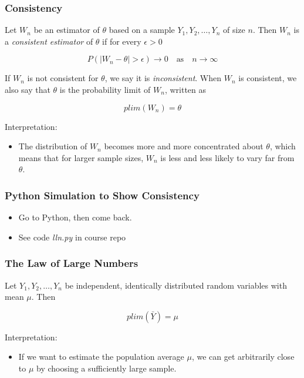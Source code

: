 \documentclass[12pt]{beamer}
\begin{document}
\begin{frame}
\frametitle{Consistency}
Let $W_{n}$ be an estimator of $\theta$ based on a sample $Y_{1}, Y_{2}, \ldots, Y_{n}$ of size $n$. Then
$W_{n}$ is a \emph{consistent estimator} of $\theta$ if for every $\epsilon > 0$

\vspace{2mm}
\begin{equation*}
P(|W_{n} - \theta| > \epsilon) \rightarrow 0 \quad \mbox{as} \quad n \rightarrow \infty
\end{equation*}

\vspace{3.5mm}
If $W_{n}$ is not consistent for $\theta$, we say it is \emph{inconsistent}. When $W_{n}$ is consistent,
we also say that $\theta$ is the probability limit of $W_{n}$, written as 

\begin{equation*}
plim(W_{n}) = \theta
\end{equation*}

\vspace{3.5mm}
Interpretation:

\begin{itemize}
 \item[] The distribution of $W_{n}$ becomes more and more concentrated about $\theta$, which means
         that for larger sample sizes, $W_{n}$ is less and less likely to vary far from $\theta$.
\end{itemize}
\end{frame}


\begin{frame}
\frametitle{Python Simulation to Show Consistency}
\begin{itemize}
 \item Go to Python, then come back.
 \item See code \emph{lln.py} in course repo
\end{itemize}
\end{frame}


\begin{frame}
\frametitle{The Law of Large Numbers}
Let $Y_{1}, Y_{2}, \ldots, Y_{n}$ be independent, identically distributed random variables with mean
$\mu$. Then

\vspace{2mm}
\begin{equation*}
plim(\bar{Y}) = \mu
\end{equation*}

\vspace{3.5mm}
Interpretation:

\begin{itemize}
 \item[] If we want to estimate the population average $\mu$, we can get arbitrarily close to $\mu$ by
         choosing a sufficiently large sample.
\end{itemize}
\end{frame}
\end{document}
